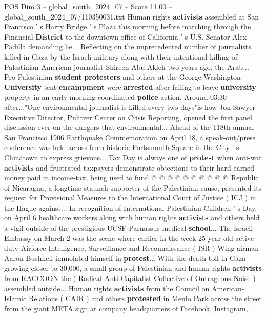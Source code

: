 \begin{textsample}{POS Dim 3 – global\_south\_2024\_07 – Score 11.00 – global\_south\_2024\_07/110350031.txt}  \label{ex:f3_pos_310}
Human rights \textbf{activists} assembled at San Francisco ' s Harry Bridge ' s Plaza this morning before marching through the Financial \textbf{District} to the downtown office of California ' s U.S.
Senator Alex Padilla demanding he...
Reflecting on the unprecedented number of journalists killed in Gaza by the Israeli military along with their intentional killing of Palestinian-American journalist Shireen Abu Akleh two years ago, the Arab...
Pro-Palestinian \textbf{student} \textbf{protesters} and others at the George Washington \textbf{University} tent \textbf{encampment} were \textbf{arrested} after failing to leave \textbf{university} property in an early morning coordinated \textbf{police} action.
Around 03:30 after..."One environmental journalist is killed every two days"is how Jon Sawyer Executive Director, Pulitzer Center on Crisis Reporting, opened the first panel discussion ever on the dangers that environmental...
Ahead of the 118th annual San Francisco 1906 Earthquake Commemoration on April 18, a speak-out/press conference was held across from historic Portsmouth Square in the City ' s Chinatown to express grievous...
Tax Day is always one of \textbf{protest} when anti-war \textbf{activists} and frustrated taxpayers demonstrate objections to their hard-earned money paid in income-tax, being used to fund @ @ @ @ @ @ @ @ @ @ Republic of Nicaragua, a longtime staunch supporter of the Palestinian cause, presented its request for Provisional Measures to the International Court of Justice ( ICJ ) in the Hague against...
In recognition of International Palestinian Children ' s Day, on April 6 healthcare workers along with human rights \textbf{activists} and others held a vigil outside of the prestigious UCSF Parnassus medical \textbf{school}...
The Israeli Embassy on March 2 was the scene where earlier in the week 25-year-old active-duty Airforce Intelligence, Surveillance and Reconnaissance ( ISR ) Wing airman Aaron Bushnell immolated himself in \textbf{protest}...
With the death toll in Gaza growing closer to 30,000, a small group of Palestinian and human rights \textbf{activists} from RACCOON the ( Radical Anti-Capitalist Collective of Outrageous Noise ) assembled outside...
Human rights \textbf{activists} from the Council on American-Islamic Relations ( CAIR ) and others \textbf{protested} in Menlo Park across the street from the giant META sign at company headquarters of Facebook, Instagram,...

\end{textsample}
